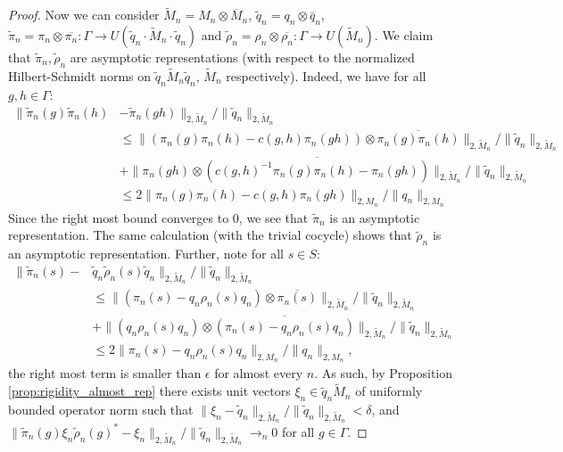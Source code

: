 \documentclass[10pt,a4paper]{amsart}
\begin{document}
\begin{proof}
        Now we can consider $\widetilde{M}_n = M_n \otimes \overline{M}_n$, $\tilde q_n = q_n\otimes \bar q_n$,  $\tilde \pi_n = \pi_n\otimes \overline{\pi_n}: \Gamma \to U(\tilde q_n \cdot \widetilde M_{n} \cdot \tilde q_n)$ and $\tilde \rho_n = \rho_n \otimes \overline{\rho_n}: \Gamma \to U(\widetilde M_{n})$. We claim that $\tilde \pi_n, \tilde \rho_n$ are asymptotic representations (with respect to the normalized Hilbert-Schmidt norms on $\tilde q_n \widetilde M_n \tilde q_n$, $\widetilde M_n$ respectively).
        Indeed, we have for all $g,h \in \Gamma$:
        \begin{align*}
             \| \tilde\pi_n(g)\tilde \pi_n(h) &-  \tilde\pi_n(gh)\|_{2, \widetilde{M}_n} / \| \tilde q_n \|_{2,\widetilde{M}_n} \\
             &\leq   \|(\pi_n(g) \pi_n(h) - c(g,h)\pi_n(gh))\otimes \overline{\pi_n(g) \pi_n(h)} \|_{2,\widetilde{M}_n} / \| \tilde q_n \|_{2,\widetilde{M}_n}\\
             &+   \| \pi_n(gh)\otimes \overline{(c(g,h)^{-1}\pi_n(g) \pi_n(h) - \pi_n(gh))} \|_{2,\widetilde{M}_n} / \| \tilde q_n \|_{2,\widetilde{M}_n}\\
             &\leq 2\|\pi_n(g) \pi_n(h) - c(g,h)\pi_n(gh) \|_{2, M_n} / \| q_n \|_{2,M_n}
        \end{align*}
        Since the right most bound converges to $0$, we see that $\tilde \pi_n$ is an asymptotic representation. The same calculation (with the trivial cocycle) shows that $\tilde \rho_n$ is an asymptotic representation.
        Further, note for all $s \in S$:
        \begin{align*}
            \| \tilde \pi_n(s) -& \tilde q_n \tilde \rho_n(s) \tilde q_n\|_{2, \widetilde M_n} / \| \tilde q_n \|_{2,\widetilde M_n} \\
            &\leq \| (\pi_n(s) - q_n \rho_n(s) q_n) \otimes \overline{\pi_n(s)} \|_{2,\widetilde{M}_n} / \| \tilde q_n\|_{2, \widetilde{M}_n} \\
            &+ \| (q_n \rho_n(s) q_n) \otimes \overline{(\pi_n(s) -q_n \rho_n(s) q_n)} \|_{2,\widetilde{M}_n} / \| \tilde q_n\|_{2, \widetilde{M}_n} \\
            &\leq2\| \pi_n(s) - q_n\rho_n(s) q_n\|_{2,M_n} / \|q_n \|_{2,M_n},
        \end{align*}
        the right most term is smaller than $\epsilon$ for almost every $n$. As such, by Proposition \ref{prop:rigidity_almost_rep}  there exists unit vectors $\xi_n \in \tilde q_n \widetilde{M}_n$ of uniformly bounded operator norm such that $\| \xi_n - \tilde q_n \|_{2, \widetilde{M}_n} / \| \tilde q_n\|_{2, \widetilde{M}_n} < \delta$, and$\|\tilde \pi_n(g)\xi_n \tilde \rho_n(g)^* - \xi_n \|_{2,\widetilde M_n} / \| \tilde q_n \|_{2,\widetilde M_n} \to_{n} 0$ for all $g \in \Gamma$.

\end{proof}
\end{document}
